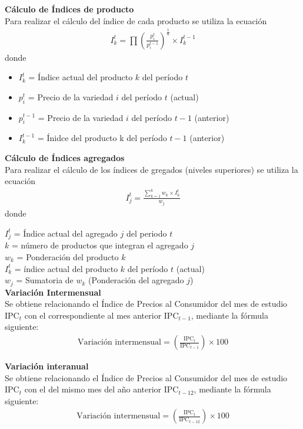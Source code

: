 {\setlength{\parindent}{0cm} 
\newcommand{\IPC}[1]{\text{IPC}_{#1}}
\textbf{Cálculo de Índices de producto}\\
Para realizar el cálculo del índice de cada producto se utiliza la ecuación
\begin{align*}
	I_{k}^{t} =  \prod \left( \frac{p_{i}^{t}}{p_{i}^{t-1}} \right)^{\frac{1}{n}} \times I_{k}^{t-1}
\end{align*}
donde
\begin{itemize}
    \item[]$I_{k}^{t}$ = Índice actual del producto $k$ del período $t$
    \item[]$p_{i}^{t}$ = Precio de la variedad $i$ del período $t$ (actual)
    \item[]$p_{i}^{t-1}$ = Precio de la variedad $i$ del período $t-1$ (anterior)
    \item[]$I_{k}^{t-1}$ = Ínidce del producto k del período $t-1$ (anterior)
\end{itemize}

\textbf{Cálculo de Índices agregados}\\
Para realizar el cálculo de los índices de gregados (niveles superiores) se utiliza la ecuación
\begin{align*}
	I_{j}^{t} = \frac{ \sum_{k=1}^{k} w_{k} \times I_{k}^{t}}{w_{j}}
\end{align*}
donde

$I_{j}^{t}$ = Índice actual del agregado $j$ del periodo $t$\\
$k$ = número de productos que integran el agregado $j$\\
$w_{k}$ = Ponderación del producto $k$\\
$ I_{k}^{t}$ = índice actual del producto $k$ del período $t$ (actual)\\
$w_{j}$ = Sumatoria de $w_{k}$ (Ponderación del agregado $j$)\\

\textbf{Variación Intermensual}\\
Se obtiene relacionando el Índice de Precios al Consumidor del mes de estudio $\IPC{t}$ con el correspondiente al mes anterior $\IPC{t-1}$, mediante la fórmula siguiente:
\begin{align*}
	\text{Variación intermensual} = \left( \frac{\IPC{t}}{\IPC{t-1}} \right) \times 100
\end{align*}

\textbf{Variación interanual}\\
Se obtiene relacionando el Índice de Precios al Consumidor del mes de estudio $\IPC{t}$ con el del mismo mes del año anterior $\IPC{t-12}$, mediante la fórmula siguiente:
\begin{align*}
	\text{Variación intermensual} = \left( \frac{\IPC{t}}{\IPC{t-12}} \right) \times 100
\end{align*}

}
